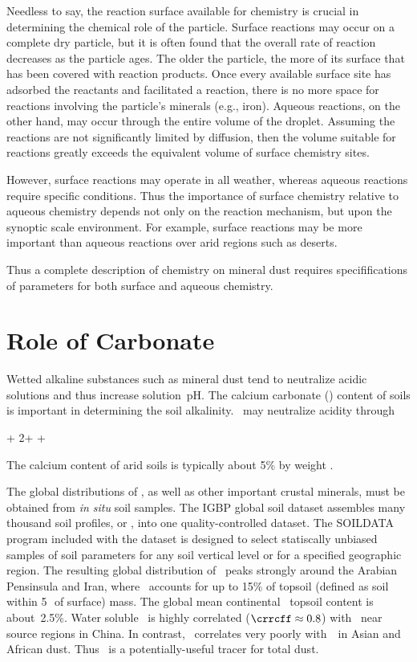 \documentclass[12pt,twoside]{book}
\newcounter{reaction} %
\begin{document}
Needless to say, the reaction surface available for chemistry is
crucial in determining the chemical role of the particle.
Surface reactions may occur on a complete dry particle, but it is
often found that the overall rate of reaction decreases as the
particle ages. 
The older the particle, the more of its surface that has been covered
with reaction products.
Once every available surface site has adsorbed the reactants and
facilitated a reaction, there is no more space for reactions involving
the particle's minerals (e.g., iron).
Aqueous reactions, on the other hand, may occur through the entire
volume of the droplet.
Assuming the reactions are not significantly limited by diffusion,
then the volume suitable for reactions greatly exceeds the equivalent
volume of surface chemistry sites.

However, surface reactions may operate in all weather, whereas aqueous
reactions require specific conditions.  
Thus the importance of surface chemistry relative to aqueous chemistry
depends not only on the reaction mechanism, but upon the synoptic
scale environment.
For example, surface reactions may be more important than aqueous
reactions over arid regions such as deserts.

Thus a complete description of chemistry on mineral dust requires
specififications of parameters for both surface and aqueous
chemistry. 

\section[Role of Carbonate]{Role of Carbonate}\label{sxn:chm_dst_CO3}
Wetted alkaline substances such as mineral dust tend to neutralize
acidic solutions and thus increase solution~pH\@.
The calcium carbonate (\CaCOt) content of soils is important in
determining the soil alkalinity.
\CaCOt\ may neutralize acidity through
\begin{reaction}
\CaCOt + 2\Hp \yields \Cadp + \COd + \HdO \\ %
\end{reaction}
The calcium content of arid soils is typically about 5\% by weight
\cite[]{Pye87,DCZ96}.

The global distributions of \CaCOt, as well as other important crustal 
minerals, must be obtained from \textit{in situ} soil samples.
The IGBP global soil dataset \cite[]{CaS98,Sch99} assembles many
thousand soil profiles, or , into one
quality-controlled dataset. 
The SOILDATA program included with the dataset is designed to select
statiscally unbiased samples of soil parameters for any soil vertical
level or  for a specified geographic region.
The resulting global distribution of \CaCOt\ peaks strongly around the
Arabian Pensinsula and Iran, where \CaCOt\ accounts for up to 15\% of
topsoil (defined as soil within 5\,\cm\ of surface) mass.
The global mean continental \CaCOt\ topsoil content is about~2.5\%.
Water soluble \Cadp\ is highly correlated ($\crrcff \approx 0.8$) with
\Al\ near source regions in China.
In contrast, \Si\ correlates very poorly with~\Al\ in Asian and
African dust. 
Thus \Ca\ is a potentially-useful tracer for total dust.
\end{document}
